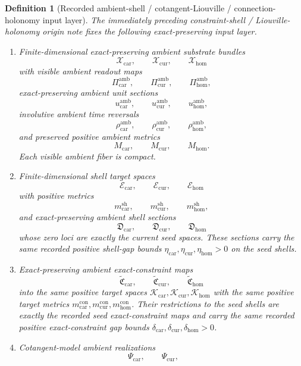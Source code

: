\documentclass[11pt]{article}
\newcommand{\TensorConstraintTarget}{\mathcal K_{\mathrm{car}}}
\newcommand{\CurConstraintTarget}{\mathcal K_{\mathrm{cur}}}
\newcommand{\HomConstraintTarget}{\mathcal K_{\mathrm{hom}}}
\newcommand{\TensorConstraintMetric}{m_{\mathrm{car}}^{\mathrm{con}}}
\newcommand{\CurConstraintMetric}{m_{\mathrm{cur}}^{\mathrm{con}}}
\newcommand{\HomConstraintMetric}{m_{\mathrm{hom}}^{\mathrm{con}}}
\newcommand{\TensorConstraintGap}{\delta_{\mathrm{car}}}
\newcommand{\CurConstraintGap}{\delta_{\mathrm{cur}}}
\newcommand{\HomConstraintGap}{\delta_{\mathrm{hom}}}
\newcommand{\TensorAmbientSpace}{\mathcal X_{\mathrm{car}}}
\newcommand{\CurAmbientSpace}{\mathcal X_{\mathrm{cur}}}
\newcommand{\HomAmbientSpace}{\mathcal X_{\mathrm{hom}}}
\newcommand{\TensorAmbientRead}{\Pi_{\mathrm{car}}^{\mathrm{amb}}}
\newcommand{\CurAmbientRead}{\Pi_{\mathrm{cur}}^{\mathrm{amb}}}
\newcommand{\HomAmbientRead}{\Pi_{\mathrm{hom}}^{\mathrm{amb}}}
\newcommand{\TensorAmbientUnit}{u_{\mathrm{car}}^{\mathrm{amb}}}
\newcommand{\CurAmbientUnit}{u_{\mathrm{cur}}^{\mathrm{amb}}}
\newcommand{\HomAmbientUnit}{u_{\mathrm{hom}}^{\mathrm{amb}}}
\newcommand{\TensorAmbientTimeRev}{\rho_{\mathrm{car}}^{\mathrm{amb}}}
\newcommand{\CurAmbientTimeRev}{\rho_{\mathrm{cur}}^{\mathrm{amb}}}
\newcommand{\HomAmbientTimeRev}{\rho_{\mathrm{hom}}^{\mathrm{amb}}}
\newcommand{\TensorAmbientMetric}{M_{\mathrm{car}}}
\newcommand{\CurAmbientMetric}{M_{\mathrm{cur}}}
\newcommand{\HomAmbientMetric}{M_{\mathrm{hom}}}
\newcommand{\TensorShellTarget}{\mathcal E_{\mathrm{car}}}
\newcommand{\CurShellTarget}{\mathcal E_{\mathrm{cur}}}
\newcommand{\HomShellTarget}{\mathcal E_{\mathrm{hom}}}
\newcommand{\TensorShellMetric}{m_{\mathrm{car}}^{\mathrm{sh}}}
\newcommand{\CurShellMetric}{m_{\mathrm{cur}}^{\mathrm{sh}}}
\newcommand{\HomShellMetric}{m_{\mathrm{hom}}^{\mathrm{sh}}}
\newcommand{\TensorShellSection}{\mathfrak D_{\mathrm{car}}}
\newcommand{\CurShellSection}{\mathfrak D_{\mathrm{cur}}}
\newcommand{\HomShellSection}{\mathfrak D_{\mathrm{hom}}}
\newcommand{\TensorShellGap}{\eta_{\mathrm{car}}}
\newcommand{\CurShellGap}{\eta_{\mathrm{cur}}}
\newcommand{\HomShellGap}{\eta_{\mathrm{hom}}}
\newcommand{\TensorAmbientConstraintMap}{\widetilde{\mathfrak C}_{\mathrm{car}}}
\newcommand{\CurAmbientConstraintMap}{\widetilde{\mathfrak C}_{\mathrm{cur}}}
\newcommand{\HomAmbientConstraintMap}{\widetilde{\mathfrak C}_{\mathrm{hom}}}
\newcommand{\TensorCotangentRealization}{\Psi_{\mathrm{car}}}
\newcommand{\CurCotangentRealization}{\Psi_{\mathrm{cur}}}
\newtheorem{definition}{Definition}
\begin{document}
\begin{definition}[Recorded ambient-shell / cotangent-Liouville / connection-holonomy input layer]
\label{def:recorded_ambient_layer}
The immediately preceding constraint-shell / Liouville-holonomy origin note fixes the following exact-preserving input layer.
\begin{enumerate}
    \item Finite-dimensional exact-preserving ambient substrate bundles
    \[
    \TensorAmbientSpace,\qquad
    \CurAmbientSpace,\qquad
    \HomAmbientSpace
    \]
    with visible ambient readout maps
    \[
    \TensorAmbientRead,\qquad
    \CurAmbientRead,\qquad
    \HomAmbientRead,
    \]
    exact-preserving ambient unit sections
    \[
    \TensorAmbientUnit,\qquad
    \CurAmbientUnit,\qquad
    \HomAmbientUnit,
    \]
    involutive ambient time reversals
    \[
    \TensorAmbientTimeRev,\qquad
    \CurAmbientTimeRev,\qquad
    \HomAmbientTimeRev,
    \]
    and preserved positive ambient metrics
    \[
    \TensorAmbientMetric,\qquad
    \CurAmbientMetric,\qquad
    \HomAmbientMetric.
    \]
    Each visible ambient fiber is compact.
    \item Finite-dimensional shell target spaces
    \[
    \TensorShellTarget,\qquad
    \CurShellTarget,\qquad
    \HomShellTarget
    \]
    with positive metrics
    \[
    \TensorShellMetric,\qquad
    \CurShellMetric,\qquad
    \HomShellMetric,
    \]
    and exact-preserving ambient shell sections
    \[
    \TensorShellSection,\qquad
    \CurShellSection,\qquad
    \HomShellSection
    \]
    whose zero loci are exactly the current seed spaces. These sections carry the same recorded positive shell-gap bounds \(\TensorShellGap,\CurShellGap,\HomShellGap>0\) on the seed shells.
    \item Exact-preserving ambient exact-constraint maps
    \[
    \TensorAmbientConstraintMap,\qquad
    \CurAmbientConstraintMap,\qquad
    \HomAmbientConstraintMap
    \]
    into the same positive target spaces \(\TensorConstraintTarget,\CurConstraintTarget,\HomConstraintTarget\) with the same positive target metrics \(\TensorConstraintMetric,\CurConstraintMetric,\HomConstraintMetric\). Their restrictions to the seed shells are exactly the recorded seed exact-constraint maps and carry the same recorded positive exact-constraint gap bounds \(\TensorConstraintGap,\CurConstraintGap,\HomConstraintGap>0\).
    \item Cotangent-model ambient realizations
    \[
    \TensorCotangentRealization,\qquad
    \CurCotangentRealization,\qquad
\]
\end{enumerate}
\end{definition}
\end{document}
